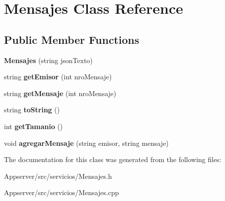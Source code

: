 \hypertarget{classMensajes}{}\section{Mensajes Class Reference}
\label{classMensajes}
\subsection*{Public Member Functions}
\begin{DoxyCompactItemize}
\item 
{\bfseries Mensajes} (string json\+Texto)\hypertarget{classMensajes_a024b1e59811c21e05e2a5fbe8f8ddfd2}{}\label{classMensajes_a024b1e59811c21e05e2a5fbe8f8ddfd2}

\item 
string {\bfseries get\+Emisor} (int nro\+Mensaje)\hypertarget{classMensajes_aafaa164b11c9afd52a27bd64be3f847e}{}\label{classMensajes_aafaa164b11c9afd52a27bd64be3f847e}

\item 
string {\bfseries get\+Mensaje} (int nro\+Mensaje)\hypertarget{classMensajes_a635b359e1f79ffcf0ecd3931524f4df7}{}\label{classMensajes_a635b359e1f79ffcf0ecd3931524f4df7}

\item 
string {\bfseries to\+String} ()\hypertarget{classMensajes_a1b69bfdd70493bfa3e5fde215e881636}{}\label{classMensajes_a1b69bfdd70493bfa3e5fde215e881636}

\item 
int {\bfseries get\+Tamanio} ()\hypertarget{classMensajes_abb73e0ae442301ff55f77121432572dc}{}\label{classMensajes_abb73e0ae442301ff55f77121432572dc}

\item 
void {\bfseries agregar\+Mensaje} (string emisor, string mensaje)\hypertarget{classMensajes_ac9cef976098cfebde8e682bdd91d6695}{}\label{classMensajes_ac9cef976098cfebde8e682bdd91d6695}

\end{DoxyCompactItemize}


The documentation for this class was generated from the following files\+:\begin{DoxyCompactItemize}
\item 
Appserver/src/servicios/Mensajes.\+h\item 
Appserver/src/servicios/Mensajes.\+cpp\end{DoxyCompactItemize}
